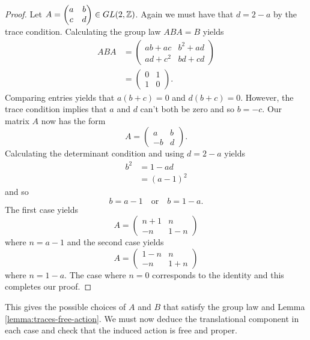 \begin{proof}
    Let $A= \begin{pmatrix}
            a & b \\
            c & d
        \end{pmatrix} \in GL(2, \mathbb{Z}) $. Again we must have that $d = 2-a$ by the trace condition. Calculating the group law $ABA =B$ yields
    \begin{align*}
        ABA & = \begin{pmatrix}
                    ab + ac  & b^2 + ad \\
                    ad + c^2 & bd + cd
                \end{pmatrix} \\
            & = \begin{pmatrix}
                    0 & 1 \\
                    1 & 0
                \end{pmatrix}.
    \end{align*}
    Comparing entries yields that $a(b+c) = 0$ and $d(b+c) = 0$. However, the trace condition implies that $a$ and $d$ can't both be zero and so $b = -c$.
    Our matrix $A$ now has the form
    $$
        A = \begin{pmatrix}
            a  & b \\
            -b & d
        \end{pmatrix}.
    $$
    Calculating the determinant condition and using $d = 2-a$ yields
    \begin{align*}
        b^2 & = 1-ad    \\
            & = (a-1)^2
    \end{align*}
    and so
    $$ b = a-1\quad \text{or} \quad b = 1-a.$$
    The first case yields
    $$
        A= \begin{pmatrix}
            n+1 & n   \\
            -n  & 1-n
        \end{pmatrix}
    $$
    where $n = a-1$ and the second case yields
    $$
        A= \begin{pmatrix}
            1-n & n   \\
            -n  & 1+n
        \end{pmatrix}
    $$
    where $n = 1-a$. The case where $n=0$ corresponds to the identity and this completes our proof.
\end{proof}

This gives the possible choices of $A$ and $B$ that satisfy the group law and
Lemma \ref{lemma:traces-free-action}. We must now deduce the translational
component in each case and check that the induced action is free and proper.

